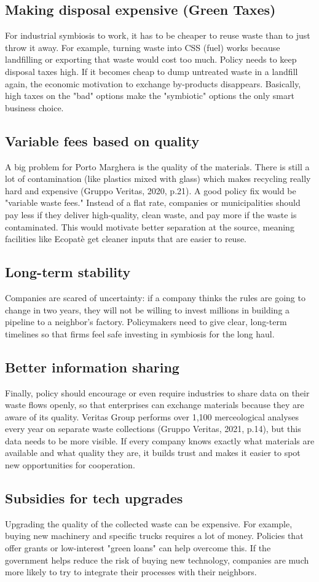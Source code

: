 \subsection{Making disposal expensive (Green Taxes)}
For industrial symbiosis to work, it has to be cheaper to reuse waste than to just throw it away. For example, turning waste into CSS (fuel) works because landfilling or exporting that waste would cost too much. Policy needs to keep disposal taxes high. If it becomes cheap to dump untreated waste in a landfill again, the economic motivation to exchange by-products disappears. Basically, high taxes on the "bad" options make the "symbiotic" options the only smart business choice.
\subsection{Variable fees based on quality}
A big problem for Porto Marghera is the quality of the materials. There is still a lot of contamination (like plastics mixed with glass) which makes recycling really hard and expensive (Gruppo Veritas, 2020, p.21). A good policy fix would be "variable waste fees." Instead of a flat rate, companies or municipalities should pay less if they deliver high-quality, clean waste, and pay more if the waste is contaminated. This would motivate better separation at the source, meaning facilities like Ecopatè get cleaner inputs that are easier to reuse.
\subsection{Long-term stability}
Companies are scared of uncertainty: if a company thinks the rules are going to change in two years, they will not be willing to invest millions in building a pipeline to a neighbor's factory. Policymakers need to give clear, long-term timelines so that firms feel safe investing in symbiosis for the long haul.
\subsection{Better information sharing}
Finally, policy should encourage or even require industries to share data on their waste flows openly, so that enterprises can exchange materials because they are aware of its quality. Veritas Group performs over 1,100 merceological analyses every year on separate waste collections (Gruppo Veritas, 2021, p.14), but this data needs to be more visible. If every company knows exactly what materials are available and what quality they are, it builds trust and makes it easier to spot new opportunities for cooperation.
\subsection{Subsidies for tech upgrades}
Upgrading the quality of the collected waste can be expensive. For example, buying new machinery and specific trucks requires a lot of money. Policies that offer grants or low-interest "green loans" can help overcome this. If the government helps reduce the risk of buying new technology, companies are much more likely to try to integrate their processes with their neighbors.
